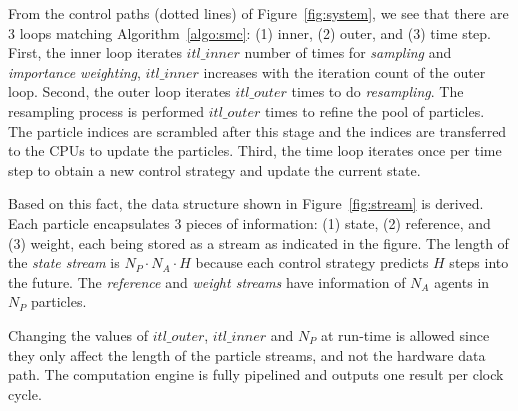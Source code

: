 From the control paths (dotted lines) of Figure~\ref{fig:system}, we see that there are 3 loops matching Algorithm~\ref{algo:smc}: 
(1) inner, (2) outer, and (3) time step.
First, the inner loop iterates $itl\_inner$ number of times for \textit{sampling} and \textit{importance weighting},
$itl\_inner$ increases with the iteration count of the outer loop.
Second, the outer loop iterates $itl\_outer$ times to do \textit{resampling}.
The resampling process is performed $itl\_outer$ times to refine the pool of particles.
The particle indices are scrambled after this stage and the indices are transferred to the CPUs to update the particles.
Third, the time loop iterates once per time step to obtain a new control strategy and update the current state.

Based on this fact, the data structure shown in Figure~\ref{fig:stream} is derived.
Each particle encapsulates 3 pieces of information: (1) state, (2) reference, and (3) weight, each being stored as a stream as indicated in the figure.
The length of the \textit{state stream} is $N_P \cdot N_A \cdot H$ because each control strategy predicts $H$ steps into the future.
The \textit{reference} and \textit{weight streams} have information of $N_A$ agents in $N_P$ particles.

Changing the values of $itl\_outer$, $itl\_inner$ and $N_P$ at run-time is allowed since they only affect the length of the particle streams, and not the hardware data path.
The computation engine is fully pipelined and outputs one result per clock cycle.

